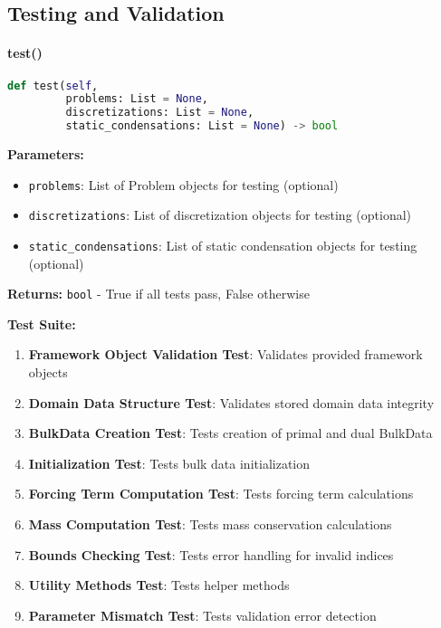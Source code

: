 \subsection{Testing and Validation}
\label{subsec:testing_validation}

\paragraph{test()}\leavevmode
\begin{lstlisting}[language=Python, caption=Test Method]
def test(self, 
         problems: List = None,
         discretizations: List = None,
         static_condensations: List = None) -> bool
\end{lstlisting}

\textbf{Parameters:}
\begin{itemize}
    \item \texttt{problems}: List of Problem objects for testing (optional)
    \item \texttt{discretizations}: List of discretization objects for testing (optional)
    \item \texttt{static\_condensations}: List of static condensation objects for testing (optional)
\end{itemize}

\textbf{Returns:} \texttt{bool} - True if all tests pass, False otherwise

\textbf{Test Suite:}
\begin{enumerate}
    \item \textbf{Framework Object Validation Test}: Validates provided framework objects
    \item \textbf{Domain Data Structure Test}: Validates stored domain data integrity
    \item \textbf{BulkData Creation Test}: Tests creation of primal and dual BulkData
    \item \textbf{Initialization Test}: Tests bulk data initialization
    \item \textbf{Forcing Term Computation Test}: Tests forcing term calculations
    \item \textbf{Mass Computation Test}: Tests mass conservation calculations
    \item \textbf{Bounds Checking Test}: Tests error handling for invalid indices
    \item \textbf{Utility Methods Test}: Tests helper methods
    \item \textbf{Parameter Mismatch Test}: Tests validation error detection
\end{enumerate}

